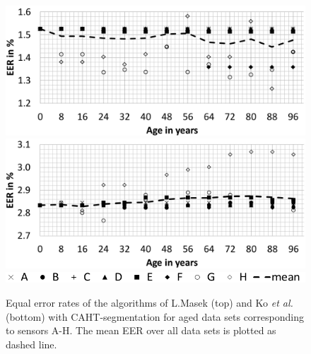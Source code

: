 \documentclass[10pt,twocolumn,letterpaper]{article}
\providecommand{\etal}[0]{\textit{et al.} }
\begin{document}
 
  \begin{figure}
  \centering
  \includegraphics[width=\linewidth]{img/lg_caht.png}
  \includegraphics[width=\linewidth]{img/ko_caht.png}
  \includegraphics[width=\linewidth]{img/legend.png}
  \caption{Equal error rates of the algorithms of L.Masek (top) and Ko \etal (bottom) with CAHT-segmentation for aged data sets corresponding to sensors A-H. The mean EER over all data sets is plotted as dashed line.}
  \label{fig:allSensors}
\end{figure}
 
\end{document}
